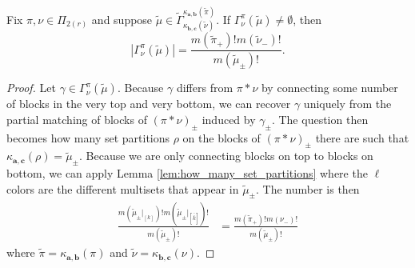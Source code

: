 \documentclass[ALCO,Unicode,published]{cedram}
\newcommand{\bfa}{{\boldsymbol{a}}}
\newcommand{\bfb}{{\boldsymbol{b}}}
\newcommand{\bfc}{{\boldsymbol{c}}}
\newcommand{\tpi}{{\tilde{\pi}}}
\newcommand{\tmu}{{\tilde{\mu}}}
\newcommand{\tnu}{{\tilde{\nu}}}
\newcommand{\ovov}[1]{\bar{\bar{#1}}}
\newcommand{\ovovb}[1]{\left[\ovov{#1}\right]}
\newcommand{\abs}[1]{\left| #1\right |}
\begin{document}
\begin{lemma}\label{lem:size_of_gamma} Fix $\pi,\nu\in \Pi_{2(r)}$ and suppose $\tmu\in\tilde{\Gamma}^{\kappa_{\bfa,\bfb}(\tpi)}_{\kappa_{\bfb,\bfc}(\tnu)}$. If $\Gamma_\nu^\pi(\tmu)\neq\emptyset$, then \[\abs{\Gamma^\pi_\nu(\tmu)}=\frac{m(\tpi_+)!m(\tnu_-)!}{m(\tmu_\pm)!}.\]
\end{lemma}

\begin{proof} Let $\gamma\in\Gamma_\nu^\pi(\tmu)$. Because $\gamma$ differs from $\pi\ast\nu$ by connecting some number of blocks in the very top and very bottom, we can recover $\gamma$ uniquely from the partial matching of blocks of $(\pi\ast\nu)_\pm$ induced by $\gamma_\pm$. The question then becomes how many set partitions $\rho$ on the blocks of $(\pi\ast\nu)_\pm$ there are such that $\kappa_{\bfa,\bfc}(\rho)=\tmu_\pm$. Because we are only connecting blocks on top to blocks on bottom, we can apply Lemma \ref{lem:how_many_set_partitions} where the $\ell$ colors are the different multisets that appear in $\tmu_\pm$. The number is then \begin{align*}
    \frac{m(\tmu_\pm|_{[k]})!m(\tmu_\pm|_{\ovovb{k}})!}{m(\tmu_\pm)!}&=\frac{m(\tpi_+)!m(\nu_-)!}{m(\tmu_\pm)!}
\end{align*} where $\tpi=\kappa_{\bfa,\bfb}(\pi)$ and $\tnu=\kappa_{\bfb,\bfc}(\nu)$.
\end{proof}



\end{document}

